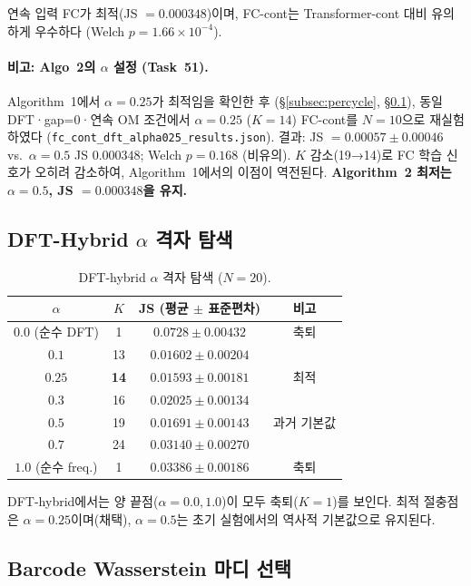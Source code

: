 \documentclass[conference,10pt,a4paper]{IEEEtran}
\begin{document}
연속 입력 FC가 최적(JS $=0.000348$)이며,
FC-cont는 Transformer-cont 대비 유의하게 우수하다
(Welch $p = 1.66 \times 10^{-4}$).

\paragraph{비고: Algo~2의 $\alpha$ 설정 (Task~51).}
Algorithm~1에서 $\alpha=0.25$가 최적임을 확인한 후
(\S\ref{subsec:percycle}, \S\ref{subsec:alpha}),
동일 DFT·gap=0·연속 OM 조건에서 $\alpha=0.25$ ($K=14$)
FC-cont를 $N=10$으로 재실험하였다
(\texttt{fc\_cont\_dft\_alpha025\_results.json}).
결과: JS $= 0.00057 \pm 0.00046$ vs.\ $\alpha=0.5$ JS $0.000348$;
Welch $p = 0.168$ (비유의).
$K$ 감소(19→14)로 FC 학습 신호가 오히려 감소하여,
Algorithm~1에서의 이점이 역전된다.
\textbf{Algorithm~2 최저는 $\alpha=0.5$, JS $=0.000348$을 유지.}

\subsection{DFT-Hybrid $\alpha$ 격자 탐색}
\label{subsec:alpha}

\begin{table}[t]
\centering
\caption{DFT-hybrid $\alpha$ 격자 탐색 ($N=20$).}
\label{tab:alpha}
\begin{tabular}{cccc}
\toprule
$\alpha$ & $K$ & JS (평균 $\pm$ 표준편차) & 비고 \\
\midrule
$0.0$ (순수 DFT) & 1  & $0.0728 \pm 0.00432$ & 축퇴 \\
$0.1$            & 13 & $0.01602 \pm 0.00204$ &  \\
\textbf{$0.25$}  & \textbf{14} & \textbf{$0.01593 \pm 0.00181$} & 최적 \\
$0.3$            & 16 & $0.02025 \pm 0.00134$ &  \\
$0.5$            & 19 & $0.01691 \pm 0.00143$ & 과거 기본값 \\
$0.7$            & 24 & $0.03140 \pm 0.00270$ &  \\
$1.0$ (순수 freq.) & 1 & $0.03386 \pm 0.00186$ & 축퇴 \\
\bottomrule
\end{tabular}
\end{table}

DFT-hybrid에서는 양 끝점($\alpha=0.0,1.0$)이 모두 축퇴($K=1$)를 보인다.
최적 절충점은 $\alpha=0.25$이며(채택),
$\alpha=0.5$는 초기 실험에서의 역사적 기본값으로 유지된다.

\subsection{Barcode Wasserstein 마디 선택}
\end{document}

